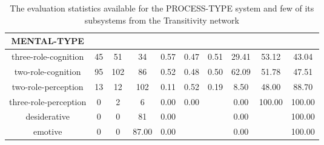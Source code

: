 \begin{table}[!ht]
{\begin{tabular}{|c|c|c|c|c|c|c|c|c|c|}
        MENTAL-TYPE &  &  &  &  &  &  &  &  &  \\ \hline
        three-role-cognition & 45 & 51 & 34 & 0.57 & 0.47 & 0.51 & 29.41 & 53.12 & 43.04 \\ \hline
        two-role-cognition & 95 & 102 & 86 & 0.52 & 0.48 & 0.50 & 62.09 & 51.78 & 47.51 \\ \hline
        two-role-perception & 13 & 12 & 102 & 0.11 & 0.52 & 0.19 & 8.50 & 48.00 & 88.70 \\ \hline
        three-role-perception & 0 & 2 & 6 & 0.00 & 0.00 &  & 0.00 & 100.00 & 100.00 \\ \hline
        desiderative & 0 & 0 & 81 & 0.00 &  &  & 0.00 &  & 100.00 \\ \hline
        emotive & 0 & 0 & 87.00 & 0.00 &  &  & 0.00 &  & 100.00 \\ \hline
    \end{tabular}
    }
    \caption{The evaluation statistics available for the PROCESS-TYPE system and few of its subsystems from the Transitivity network}
    \label{tab:features-transitivity}
\end{table}

